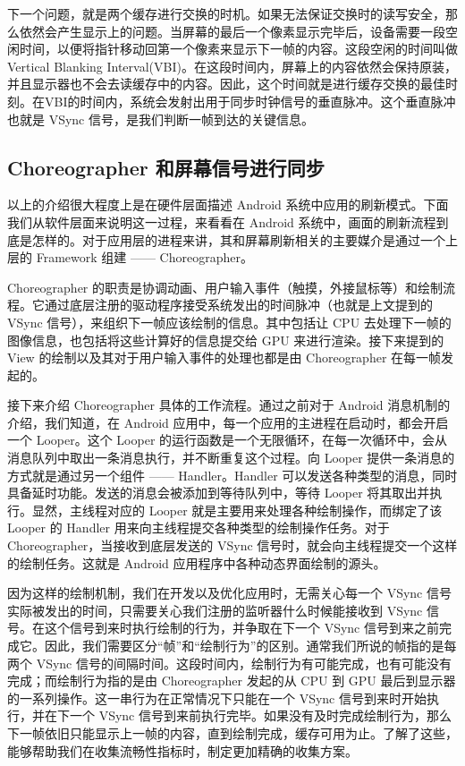 下一个问题，就是两个缓存进行交换的时机。如果无法保证交换时的读写安全，那么依然会产生显示上的问题。当屏幕的最后一个像素显示完毕后，设备需要一段空闲时间，以便将指针移动回第一个像素来显示下一帧的内容。这段空闲的时间叫做 Vertical Blanking Interval(VBI)。在这段时间内，屏幕上的内容依然会保持原装，并且显示器也不会去读缓存中的内容。因此，这个时间就是进行缓存交换的最佳时刻。在VBI的时间内，系统会发射出用于同步时钟信号的垂直脉冲。这个垂直脉冲也就是 VSync 信号，是我们判断一帧到达的关键信息。

\subsection{Choreographer 和屏幕信号进行同步}

以上的介绍很大程度上是在硬件层面描述 Android 系统中应用的刷新模式。下面我们从软件层面来说明这一过程，来看看在 Android 系统中，画面的刷新流程到底是怎样的。对于应用层的进程来讲，其和屏幕刷新相关的主要媒介是通过一个上层的 Framework 组建 —— Choreographer。

Choreographer 的职责是协调动画、用户输入事件（触摸，外接鼠标等）和绘制流程。它通过底层注册的驱动程序接受系统发出的时间脉冲（也就是上文提到的 VSync 信号），来组织下一帧应该绘制的信息。其中包括让 CPU 去处理下一帧的图像信息，也包括将这些计算好的信息提交给 GPU 来进行渲染。接下来提到的 View 的绘制以及其对于用户输入事件的处理也都是由 Choreographer 在每一帧发起的。

接下来介绍 Choreographer 具体的工作流程。通过之前对于 Android 消息机制的介绍，我们知道，在 Android 应用中，每一个应用的主进程在启动时，都会开启一个 Looper。这个 Looper 的运行函数是一个无限循环，在每一次循环中，会从消息队列中取出一条消息执行，并不断重复这个过程。向 Looper 提供一条消息的方式就是通过另一个组件 —— Handler。Handler 可以发送各种类型的消息，同时具备延时功能。发送的消息会被添加到等待队列中，等待 Looper 将其取出并执行。显然，主线程对应的 Looper 就是主要用来处理各种绘制操作，而绑定了该 Looper 的 Handler 用来向主线程提交各种类型的绘制操作任务。对于 Choreographer，当接收到底层发送的 VSync 信号时，就会向主线程提交一个这样的绘制任务。这就是 Android 应用程序中各种动态界面绘制的源头。

因为这样的绘制机制，我们在开发以及优化应用时，无需关心每一个 VSync 信号实际被发出的时间，只需要关心我们注册的监听器什么时候能接收到 VSync 信号。在这个信号到来时执行绘制的行为，并争取在下一个 VSync 信号到来之前完成它。因此，我们需要区分“帧”和“绘制行为”的区别。通常我们所说的帧指的是每两个 VSync 信号的间隔时间。这段时间内，绘制行为有可能完成，也有可能没有完成；而绘制行为指的是由 Choreographer 发起的从 CPU 到 GPU 最后到显示器的一系列操作。这一串行为在正常情况下只能在一个 VSync 信号到来时开始执行，并在下一个 VSync 信号到来前执行完毕。如果没有及时完成绘制行为，那么下一帧依旧只能显示上一帧的内容，直到绘制完成，缓存可用为止。了解了这些，能够帮助我们在收集流畅性指标时，制定更加精确的收集方案。

